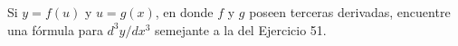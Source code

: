 \item Si $y = f(u)$ y $u = g(x)$, en donde $f$ y $g$ poseen terceras derivadas, encuentre una fórmula para $d^3y/dx^3$ semejante a la del Ejercicio 51.
